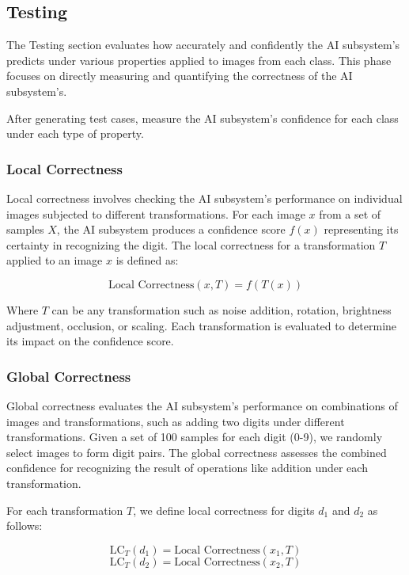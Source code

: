 \documentclass[10pt, conference, a4paper, final]{IEEEtran}
\begin{document}
\subsection{Testing }

The Testing section evaluates how accurately and confidently the  AI subsystem's predicts under various properties applied to images from each class. This phase focuses on directly measuring and quantifying the correctness of the  AI subsystem's.

 After generating test cases, measure the  AI subsystem's confidence for each class under each type of property.
     

  
    \subsubsection{Local Correctness}

    Local correctness involves checking the AI subsystem's performance on individual images subjected to different transformations. For each image \( x \) from a set of samples \( X \), the AI subsystem produces a confidence score \( f(x) \) representing its certainty in recognizing the digit. The local correctness for a transformation \( T \) applied to an image \( x \) is defined as:

    \[
        \text{Local Correctness}(x, T) = f(T(x))
    \]

    Where \( T \) can be any transformation such as noise addition, rotation, brightness adjustment, occlusion, or scaling. Each transformation is evaluated to determine its impact on the confidence score.

    
    \subsubsection{Global Correctness}

    Global correctness evaluates the AI subsystem's performance on combinations of images and transformations, such as adding two digits under different transformations. Given a set of 100 samples for each digit (0-9), we randomly select images to form digit pairs. The global correctness assesses the combined confidence for recognizing the result of operations like addition under each transformation.

    For each transformation \( T \), we define local correctness for digits \( d_1 \) and \( d_2 \) as follows:
    
    \[
    \text{LC}_{T}(d_1) = \text{Local Correctness}(x_1, T)
    \]
    \[
    \text{LC}_{T}(d_2) = \text{Local Correctness}(x_2, T)
    \]
    
\end{document}
